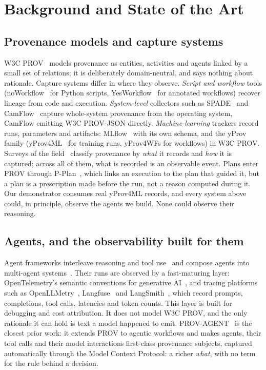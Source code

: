 \documentclass[conference]{IEEEtran}
\begin{document}
\section{Background and State of the Art}\label{sec:2}

\subsection{Provenance models and capture systems}\label{sec:2.1}

\noindent W3C PROV~\cite{provdm,provo} models provenance as entities, activities and agents linked by a small set of relations; it is deliberately domain-neutral, and says nothing about rationale. Capture systems differ in where they observe. \emph{Script and workflow} tools (noWorkflow~\cite{noworkflow} for Python scripts, YesWorkflow~\cite{yesworkflow} for annotated workflows) recover lineage from code and execution. \emph{System-level} collectors such as SPADE~\cite{spade} and CamFlow~\cite{camflow} capture whole-system provenance from the operating system, CamFlow emitting W3C PROV-JSON directly. \emph{Machine-learning} trackers record runs, parameters and artifacts: MLflow~\cite{mlflow} with its own schema, and the yProv family (yProv4ML~\cite{yprov4ml} for training runs, yProv4WFs for workflows) in W3C PROV. Surveys of the field~\cite{freire2008,herschel2017} classify provenance by \emph{what} it records and \emph{how} it is captured; across all of them, what is recorded is an observable event. Plans enter PROV through P-Plan~\cite{pplan}, which links an execution to the plan that guided it, but a plan is a prescription made before the run, not a reason computed during it. Our demonstrator consumes real yProv4ML records, and every system above could, in principle, observe the agents we build. None could observe their reasoning.

\subsection{Agents, and the observability built for them}\label{sec:2.2}

\noindent Agent frameworks interleave reasoning and tool use~\cite{react} and compose agents into multi-agent systems~\cite{autogen,langgraph}. Their runs are observed by a fast-maturing layer: OpenTelemetry's semantic conventions for generative AI~\cite{otelgenai}, and tracing platforms such as OpenLLMetry~\cite{openllmetry}, Langfuse~\cite{langfuse} and LangSmith~\cite{langsmith}, which record prompts, completions, tool calls, latencies and token counts. This layer is built for debugging and cost attribution. It does not model W3C PROV, and the only rationale it can hold is text a model happened to emit. PROV-AGENT~\cite{provagent} is the closest prior work: it extends PROV to agentic workflows and makes agents, their tool calls and their model interactions first-class provenance subjects, captured automatically through the Model Context Protocol: a richer \emph{what}, with no term for the rule behind a decision.
\end{document}
